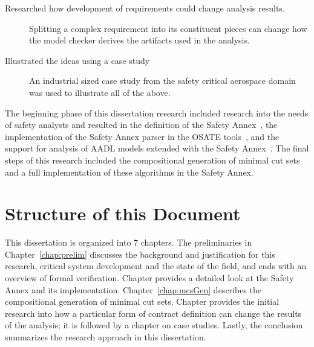 \begin{description}
\item[Researched how development of requirements could change analysis results.] Splitting a complex requirement into its constituent pieces can change how the model checker derives the artifacts used in the analysis.

\item[Illustrated the ideas using a case study] An industrial sized case study from the safety critical aerospace domain was used to illustrate all of the above.  
\end{description}

The beginning phase of this dissertation research included research into the needs of safety analysts and resulted in the definition of the Safety Annex~\cite{stewart2020safety, Stewart17:IMBSA}, the implementation of the Safety Annex parser in the OSATE tools~\cite{SEI:AADL}, and the support for analysis of AADL models extended with the Safety Annex~\cite{cofer2012compositional}. The final steps of this research included the compositional generation of minimal cut sets and a full implementation of these algorithms in the Safety Annex. 

\section{Structure of this Document}
This dissertation is organized into 7 chapters. The preliminaries in Chapter~\ref{chap:prelim} discusses the background and justification for this research, critical system development and the state of the field, and ends with an overview of formal verification. Chapter \label{chap:faultModeling} provides a detailed look at the Safety Annex and its implementation. Chapter~\ref{chap:mcsGen} describes the compositional generation of minimal cut sets. Chapter \label{chap:granularity} provides the initial research into how a particular form of contract definition can change the results of the analysis; it is followed by a chapter on case studies. Lastly, the conclusion summarizes the research approach in this dissertation.











